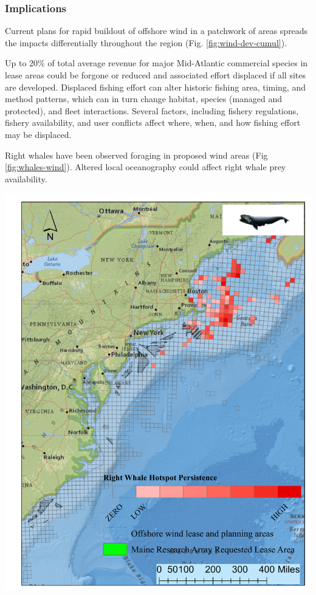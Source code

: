 \documentclass[
  10pt,
]{article}
\let\origfigure\figure
\let\endorigfigure\endfigure
\renewenvironment{figure}[1][2] {
    \expandafter\origfigure\expandafter[H]
} {
    \endorigfigure
}
\begin{document}
\hypertarget{implications-7}{%
\subsubsection{Implications}\label{implications-7}}

Current plans for rapid buildout of offshore wind in a patchwork of
areas spreads the impacts differentially throughout the region (Fig.
\ref{fig:wind-dev-cumul}).

Up to 20\% of total average revenue for major Mid-Atlantic commercial
species in lease areas could be forgone or reduced and associated effort
displaced if all sites are developed. Displaced fishing effort can alter
historic fishing area, timing, and method patterns, which can in turn
change habitat, species (managed and protected), and fleet interactions.
Several factors, including fishery regulations, fishery availability,
and user conflicts affect where, when, and how fishing effort may be
displaced.

Right whales have been observed foraging in proposed wind areas (Fig
\ref{fig:whales-wind}). Altered local oceanography could affect right
whale prey availability.

\begin{figure}

{\centering \includegraphics[width=0.6\linewidth]{images/NARW_hotpsot_persistence_2_1_2022_TPW} 

}

\caption{Northern Right Whale persistent hotspots and Wind Energy Areas.}\label{fig:whales-wind}
\end{figure}
\end{document}
